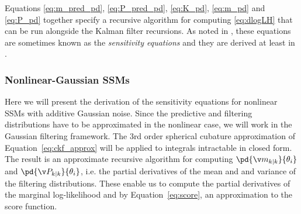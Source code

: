 Equations \eqref{eq:m_pred_pd}, \eqref{eq:P_pred_pd}, \eqref{eq:K_pd}, \eqref{eq:m_pd} and \eqref{eq:P_pd} together specify
a recursive algorithm for computing \eqref{eq:dlogLH} that can be run alongside the Kalman filter recursions.
As noted in \textcite{Cappe2005}, these equations are sometimes known as the \emph{sensitivity equations}
and they are derived at least in \textcite{Gupta1974}.


\subsubsection{Nonlinear-Gaussian SSMs}%


Here we will present the derivation of the sensitivity equations for nonlinear SSMs with additive
Gaussian noise. Since the predictive and filtering distributions have to be approximated in the nonlinear
case, we will work in the Gaussian filtering framework. The 3rd order spherical cubature approximation
of Equation~\eqref{eq:ckf_approx} will be applied to integrals intractable in closed form. The result
is an approximate recursive algorithm for computing $\pd{\m_{k|k}}{\theta_i}$ and $\pd{\P_{k|k}}{\theta_i}$,
i.e. the partial derivatives of the mean and and variance of the filtering distributions. These enable
us to compute the partial derivatives of the marginal log-likelihood and by Equation~\eqref{eq:score},
an approximation to the score function.

